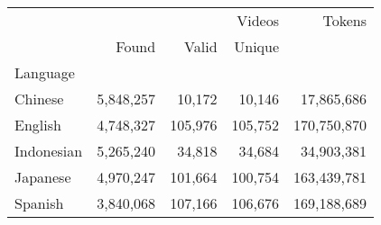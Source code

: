 \begin{tabular}{lrrrr}
\toprule
 & \multicolumn{3}{r}{Videos} & Tokens \\
 & Found & Valid & Unique &  \\
Language &  &  &  &  \\
\midrule
Chinese & 5,848,257 & 10,172 & 10,146 & 17,865,686 \\
English & 4,748,327 & 105,976 & 105,752 & 170,750,870 \\
Indonesian & 5,265,240 & 34,818 & 34,684 & 34,903,381 \\
Japanese & 4,970,247 & 101,664 & 100,754 & 163,439,781 \\
Spanish & 3,840,068 & 107,166 & 106,676 & 169,188,689 \\
\bottomrule
\end{tabular}
